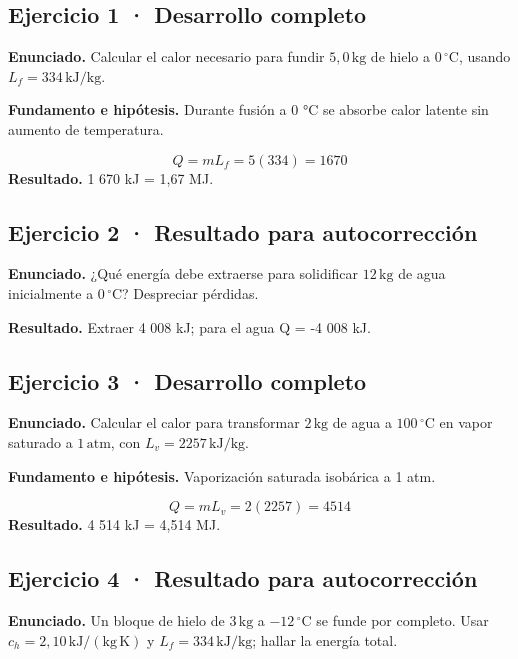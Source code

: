 \documentclass[11pt,a4paper]{article}
\begin{document}
\begin{center}\end{center}

\subsection*{Ejercicio 1 · Desarrollo completo}
\textbf{Enunciado.} Calcular el calor necesario para fundir \(5{,}0\,\mathrm{kg}\) de hielo a \(0\,^\circ\mathrm C\), usando \(L_f=334\,\mathrm{kJ/kg}\).

\textbf{Fundamento e hipótesis.} Durante fusión a 0 °C se absorbe calor latente sin aumento de temperatura.

\[
Q=mL_f=5(334)=1670
\]
\textbf{Resultado.} 1 670 kJ = 1,67 MJ.


\subsection*{Ejercicio 2 · Resultado para autocorrección}
\textbf{Enunciado.} ¿Qué energía debe extraerse para solidificar \(12\,\mathrm{kg}\) de agua inicialmente a \(0\,^\circ\mathrm C\)? Despreciar pérdidas.

\textbf{Resultado.} Extraer 4 008 kJ; para el agua Q = -4 008 kJ.


\subsection*{Ejercicio 3 · Desarrollo completo}
\textbf{Enunciado.} Calcular el calor para transformar \(2\,\mathrm{kg}\) de agua a \(100\,^\circ\mathrm C\) en vapor saturado a \(1\,\mathrm{atm}\), con \(L_v=2257\,\mathrm{kJ/kg}\).

\textbf{Fundamento e hipótesis.} Vaporización saturada isobárica a 1 atm.

\[
Q=mL_v=2(2257)=4514
\]
\textbf{Resultado.} 4 514 kJ = 4,514 MJ.


\subsection*{Ejercicio 4 · Resultado para autocorrección}
\textbf{Enunciado.} Un bloque de hielo de \(3\,\mathrm{kg}\) a \(-12\,^\circ\mathrm C\) se funde por completo. Usar \(c_h=2{,}10\,\mathrm{kJ/(kg\,K)}\) y \(L_f=334\,\mathrm{kJ/kg}\); hallar la energía total.
\end{document}
